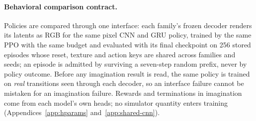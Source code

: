 \paragraph{Behavioral comparison contract.}
Policies are compared through one interface: each family's frozen decoder renders its latents as
RGB for the same pixel CNN and GRU policy, trained by the same PPO with the same budget and
evaluated with its final checkpoint on 256 stored episodes whose reset, texture and action keys
are shared across families and seeds; an episode is admitted by surviving a seven-step random
prefix, never by policy outcome. Before any imagination result is read, the same policy is trained
on \emph{real} transitions seen through each decoder, so an interface failure cannot be mistaken
for an imagination failure. Rewards and terminations in imagination come from each model's own
heads; no simulator quantity enters training (Appendices~\ref{app:hparams} and~\ref{app:shared-cnn}).

